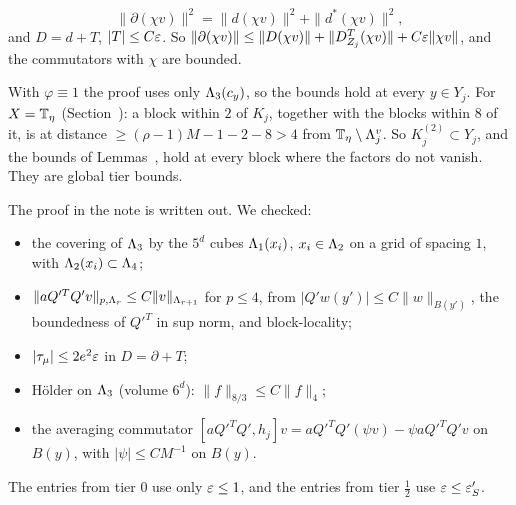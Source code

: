 \begin{detail}
\begin{step}
\[
\|\partial(\chi v)\|^2=\|d(\chi v)\|^2+\|d^*(\chi v)\|^2,
\]
and $D=d+T$, $|T|\le C\varepsilon$. So $\|\partial(\chi v)\|\le\|D(\chi v)\|+\|D^T_{Z_j}(\chi v)\|+C\varepsilon\|\chi v\|$, and the commutators with $\chi$ are bounded.
\end{step}
\begin{step}
With $\varphi\equiv1$ the proof uses only $\Lambda_3(c_y)$, so the bounds hold at every $y\in Y_j$. For $X=\mathbb T_\eta$ (Section~): a block within $2$ of $K_j$, together with the blocks within $8$ of it, is at distance $\ge(\rho-1)M-1-2-8>4$ from $\mathbb T_\eta\setminus\Lambda^v_j$. So $K_j^{(2)}\subset Y_j$, and the bounds of Lemmas~,  hold at every block where the factors do not vanish. They are global tier bounds.
\end{step}
\end{detail}

\begin{detail}\label{d9:endpoint}
The proof in the note is written out. We checked:
\begin{itemize}
\item the covering of $\Lambda_3$ by the $5^d$ cubes $\Lambda_1(x_i)$, $x_i\in\Lambda_2$ on a grid of spacing $1$, with $\Lambda_2(x_i)\subset\Lambda_4$;
\item $\|aQ'^TQ'v\|_{p,\Lambda_r}\le C\|v\|_{\Lambda_{r+1}}$ for $p\le4$, from $|Q'w(y')|\le C\|w\|_{B(y')}$, the boundedness of $Q'^T$ in sup norm, and block-locality;
\item $|\tau_\mu|\le2e^2\varepsilon$ in $D=\partial+T$;
\item H\"older on $\Lambda_3$ (volume $6^d$): $\|f\|_{8/3}\le C\|f\|_4$;
\item the averaging commutator $[aQ'^TQ',h_j]v=aQ'^TQ'(\psi v)-\psi aQ'^TQ'v$ on $B(y)$, with $|\psi|\le CM^{-1}$ on $B(y)$.
\end{itemize}
The entries from tier $0$ use only $\varepsilon\le1$, and the entries from tier $\frac12$ use $\varepsilon\le\varepsilon'_S$.
\end{detail}

